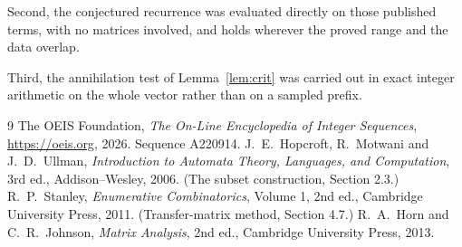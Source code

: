 \documentclass[11pt,a4paper]{article}
\theoremstyle{plain}
\theoremstyle{definition}
\begin{document}
Second, the conjectured recurrence was evaluated directly on those published terms, with no
matrices involved, and holds wherever the proved range and the data overlap.

Third, the annihilation test of Lemma~\ref{lem:crit} was carried out in exact integer
arithmetic on the whole vector rather than on a sampled prefix.

\begin{thebibliography}{9}
 The OEIS Foundation, \emph{The On-Line Encyclopedia of Integer
Sequences}, \url{https://oeis.org}, 2026. Sequence A220914.
 J.~E.~Hopcroft, R.~Motwani and J.~D.~Ullman, \emph{Introduction to Automata
Theory, Languages, and Computation}, 3rd ed., Addison--Wesley, 2006. (The subset
construction, Section 2.3.)
 R.~P.~Stanley, \emph{Enumerative Combinatorics}, Volume 1, 2nd ed.,
Cambridge University Press, 2011. (Transfer-matrix method, Section 4.7.)
 R.~A.~Horn and C.~R.~Johnson, \emph{Matrix Analysis}, 2nd ed., Cambridge
University Press, 2013.
\end{thebibliography}
\end{document}
